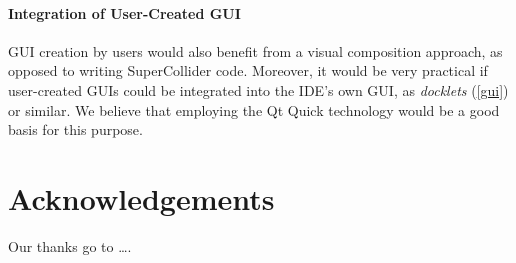 \documentclass[11pt,a4paper]{article}
\begin{document}
\paragraph{Integration of User-Created GUI} \hfill

GUI creation by users would also benefit from a visual composition approach, as opposed to writing SuperCollider code.
Moreover, it would be very practical if user-created GUIs could be integrated into the IDE's own GUI, as
\emph{docklets} (\ref{gui}) or similar. We believe that employing the Qt Quick technology would be a good basis for this
purpose.


\section{Acknowledgements}

Our thanks go to \ldots .



\end{document}
